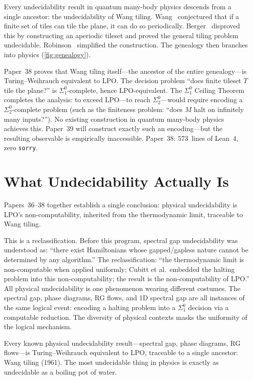 \documentclass[11pt,a4paper]{report}
\theoremstyle{plain}
\theoremstyle{definition}
\theoremstyle{remark}
\newcommand{\LPO}{\mathrm{LPO}}
\begin{document}
Every undecidability result in quantum many-body physics descends from a single ancestor: the undecidability of Wang tiling. Wang~\cite{Wang1961} conjectured that if a finite set of tiles can tile the plane, it can do so periodically. Berger~\cite{Berger1966} disproved this by constructing an aperiodic tileset and proved the general tiling problem undecidable. Robinson~\cite{Robinson1971} simplified the construction. The genealogy then branches into physics (\cref{fig:genealogy}).

Paper~38 proves that Wang tiling itself---the ancestor of the entire genealogy---is Turing--Weihrauch equivalent to $\LPO$. The decision problem ``does finite tileset $T$ tile the plane?'' is $\Sigma^0_1$-complete, hence $\LPO$-equivalent. The $\Sigma^0_1$ Ceiling Theorem completes the analysis: to exceed $\LPO$---to reach $\Sigma^0_2$---would require encoding a $\Sigma^0_2$-complete problem (such as the finiteness problem: ``does $M$ halt on infinitely many inputs?''). No existing construction in quantum many-body physics achieves this. Paper~39 will construct exactly such an encoding---but the resulting observable is empirically inaccessible. Paper~38: 573~lines of Lean~4, zero \texttt{sorry}.

\section{What Undecidability Actually Is}

Papers~36--38 together establish a single conclusion: physical undecidability is $\LPO$'s non-computability, inherited from the thermodynamic limit, traceable to Wang tiling.

This is a reclassification. Before this program, spectral gap undecidability was understood as: ``there exist Hamiltonians whose gapped/gapless nature cannot be determined by any algorithm.'' The reclassification: ``the thermodynamic limit is non-computable when applied uniformly; Cubitt et al.\ embedded the halting problem into this non-computability; the result is the non-computability of $\LPO$.'' All physical undecidability is one phenomenon wearing different costumes. The spectral gap, phase diagrams, RG flows, and 1D spectral gap are all instances of the same logical event: encoding a halting problem into a $\Sigma^0_1$ decision via a computable reduction. The diversity of physical contexts masks the uniformity of the logical mechanism.

\begin{chapterbox}
Every known physical undecidability result---spectral gap, phase diagrams, RG flows---is Turing--Weihrauch equivalent to $\LPO$, traceable to a single ancestor: Wang tiling (1961). The most undecidable thing in physics is exactly as undecidable as a boiling pot of water.
\end{chapterbox}
\end{document}

